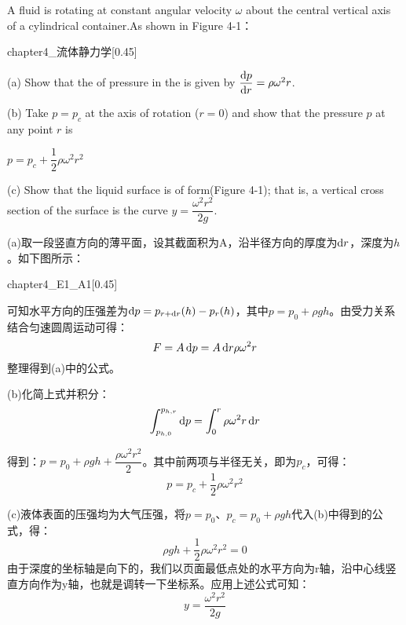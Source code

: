 \chapter[流体力学]{}
\begin{solution}[流体静力学]
    A fluid is rotating at constant angular velocity $\omega$ about the central vertical axis of a cylindrical container.As shown in Figure 4-1：
    \begin{singlefigure}[流体静力学]{chapter4_流体静力学}[0.45]
    \end{singlefigure}

    (a) Show that the  of pressure in the  is given by $\dfrac{\dif p}{\dif r}=\rho \omega^2 r$.

    (b) Take $p=p_c$ at the axis of rotation ($r=0$) and show that the pressure $p$ at any point $r$ is
    \begin{center}
        $p=p_c+\dfrac{1}{2}\rho\omega^2 r^2$
    \end{center}

    (c) Show that the liquid surface is of  form(Figure 4-1); that is, a vertical cross section of the surface is the curve $y=\dfrac{\omega^2 r^2}{2g}$.

    \tcbrule

    (a)取一段竖直方向的薄平面，设其截面积为A，沿半径方向的厚度为$\dif r$，深度为$h$。如下图所示：
    \begin{singlefigure}[A-4-1]{chapter4_E1_A1}[0.45]
    \end{singlefigure}

    可知水平方向的压强差为$\dif p=p_{r+\dif r}(h)-p_r(h)$，其中$p=p_0+\rho gh$。由受力关系结合匀速圆周运动可得：
    \[F=A\dif p=A\dif r \rho \omega^2 r\]
    整理得到(a)中的公式。

    (b)化简上式并积分：
    \[\int_{p_{h,0}}^{p_{h,r}}\dif p=\int_{0}^{r}\rho \omega^2 r\dif r\]

    得到：$p=p_0+\rho gh+\dfrac{\rho \omega^2 r^2}{2}$。其中前两项与半径无关，即为$p_c$，可得：
    \[p=p_c+\dfrac{1}{2}\rho \omega^2 r^2\]

    (c)液体表面的压强均为大气压强，将$p=p_0$、$p_c=p_0+\rho gh$代入(b)中得到的公式，得：
    \[\rho gh+\dfrac{1}{2}\rho \omega^2 r^2=0\]
    由于深度的坐标轴是向下的，我们以页面最低点处的水平方向为r轴，沿中心线竖直方向作为y轴，也就是调转一下坐标系。应用上述公式可知：
    \[y=\dfrac{\omega^2 r^2}{2g}\]
\end{solution}

